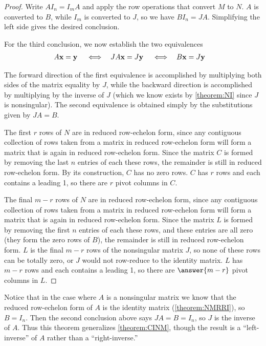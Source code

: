\documentclass{ximera}
\begin{document}
\begin{theorem}
\begin{proof}
    Write $AI_n=I_mA$ and apply the row operations that convert $M$ to
    $N$.  $A$ is converted to $B$, while $I_m$ is converted to $J$, so
    we have $BI_n=JA$.  Simplifying the left side gives the desired
    conclusion.

    For the third conclusion, we now establish the two equivalences
    \begin{align*}
      A\mathbf{x}&=\mathbf{y} &
      &\iff &
              JA\mathbf{x}&=J\mathbf{y} &
      &\iff &
              B\mathbf{x}&=J\mathbf{y}
    \end{align*}

    The forward direction of the first equivalence is accomplished by
    multiplying both sides of the matrix equality by $J$, while the
    backward direction is accomplished by multiplying by the inverse
    of $J$ (which we know exists by \ref{theorem:NI} since $J$ is
    nonsingular).  The second equivalence is obtained simply by the
    substitutions given by $JA=B$.

    The first $r$ rows of $N$ are in reduced row-echelon form, since
    any contiguous collection of rows taken from a matrix in reduced
    row-echelon form will form a matrix that is again in reduced
    row-echelon form.  Since the matrix $C$ is formed by removing the
    last $n$ entries of each these rows, the remainder is still in
    reduced row-echelon form.  By its construction, $C$ has no zero
    rows. $C$ has $r$ rows and each contains a leading 1, so there are
    $r$ pivot columns in $C$.

    The final $m-r$ rows of $N$ are in reduced row-echelon form, since
    any contiguous collection of rows taken from a matrix in reduced
    row-echelon form will form a matrix that is again in reduced
    row-echelon form.  Since the matrix $L$ is formed by removing the
    first $n$ entries of each these rows, and these entries are all
    zero (they form the zero rows of $B$), the remainder is still in
    reduced row-echelon form.  $L$ is the final $m-r$ rows of the
    nonsingular matrix $J$, so none of these rows can be totally zero,
    or $J$ would not row-reduce to the identity matrix.  $L$ has $m-r$
    rows and each contains a leading 1, so there are $\answer{m-r}$
    pivot columns in $L$.
\end{proof}
\end{theorem}

Notice that in the case where $A$ is a nonsingular matrix we know that
the reduced row-echelon form of $A$ is the identity matrix
(\ref{theorem:NMRRI}), so $B=I_n$.  Then the second conclusion above
says $JA=B=I_n$, so $J$ is the inverse of $A$.  Thus this theorem
generalizes \ref{theorem:CINM}, though the result is a
``left-inverse'' of $A$ rather than a ``right-inverse.''
\end{document}
